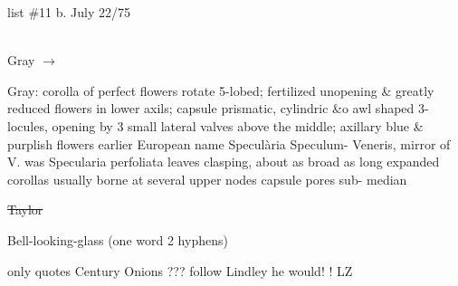 \documentclass[a4paper]{article}
\begin{document}
\begin{minipage}{0.1\textwidth}
\Circled{\color{blue}{13}} 
\end{minipage}
\begin{minipage}{0.2\textwidth}
\color{blue}
\null list \#11
b. July 22/75
\end{minipage}
\begin{minipage}{0.7\textwidth}
\begin{flushright}
\color{blue}
\\
Gray
$\rightarrow$
\color{red}\Circled{\color{blue}{Venus's Looking-glass}}\\
\end{flushright}
\end{minipage}
\color{blue}
\begin{minipage}[t]{0.2\textwidth}
Gray: corolla
of perfect flowers
rotate 5-lobed;
fertilized
unopening \&
greatly reduced
flowers in lower
axils; capsule
prismatic, cylindric
\&o awl shaped 3-
locules, opening
by 3 small lateral
valves
above the
middle; axillary
blue \& purplish %
flowers earlier
European name
Specul\`aria Speculum- 
Veneris, mirror of V.
was Specularia perfoliata
leaves clasping, about as
broad as long expanded
corollas usually borne
at several upper nodes
capsule pores sub-
median

\sout{Taylor}

Bell-looking-glass
(one word
2 hyphens)

only 
quotes Century
Onions ???
follow Lindley
he would!
! LZ
\end{minipage}
\hspace{0.1\textwidth}
\end{document}
